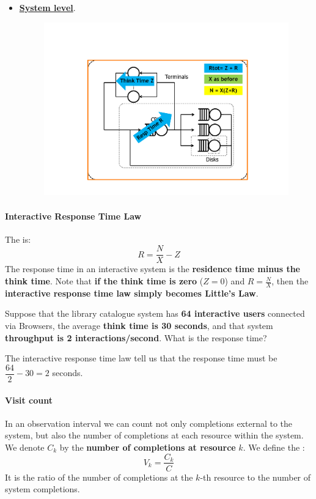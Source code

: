 \begin{itemize}
	\item \textbf{\underline{System level}}. 
	\begin{figure}[!htp]
		\centering
		\includegraphics[width=.7\textwidth]{img/little-law-4.pdf}
	\end{figure}
\end{itemize}

\newpage

\paragraph{Interactive Response Time Law}

The  is:
\begin{equation}
	R = \dfrac{N}{X} - Z
\end{equation}
The response time in an interactive system is the \textbf{residence time minus the think time}. Note that \textbf{if the think time is zero} ($Z=0$) and $R = \frac{N}{X}$, then the \textbf{interactive response time law simply becomes Little's Law}.

\begin{examplebox}
	Suppose that the library catalogue system has \textbf{64 interactive users} connected via Browsers, the average \textbf{think time is 30 seconds}, and that system \textbf{throughput is 2 interactions/second}. What is the response time?
	
	The interactive response time law tell us that the response time must be $\dfrac{64}{2}-30 = 2$ seconds.
\end{examplebox}

\longline

\paragraph{Visit count}

In an observation interval we can count not only completions external to the system, but also the number of completions at each resource within the system. We denote $C_{k}$ by the \textbf{number of completions at resource} $k$. We define the :
\begin{equation}
	V_{k} = \dfrac{C_{k}}{C}
\end{equation}
It is the ratio of the number of completions at the $k$-th resource to the number of system completions.

